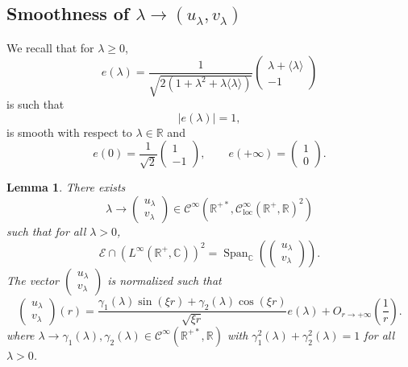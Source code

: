\documentclass[11 pt]{amsart}
\newcommand{\tmop}[1]{\ensuremath{\operatorname{#1}}}
\newtheorem{lem}{Lemma}[section]
\theoremstyle{definition}
\theoremstyle{remark}
\numberwithin{equation}{section}
\begin{document}
\subsection{Smoothness of $\lambda \rightarrow (u_{\lambda},
v_{\lambda})$}\label{ss27n}
We recall that for $\lambda \geqslant 0$,
\[ e (\lambda) = \frac{1}{\sqrt{2 \left( 1 + \lambda^2 + \lambda
   \langle \lambda \rangle \right)}} \left(\begin{array}{c}
     \lambda + \langle \lambda \rangle\\
     - 1
   \end{array}\right) \]
is such that
\[ | e (\lambda) | = 1, \]
is smooth with respect to $\lambda\in \mathbb R$ and
\[ e (0) = \frac{1}{\sqrt{2}} \left(\begin{array}{c}
     1\\
     - 1
   \end{array}\right), \qquad e (+ \infty) = \left(\begin{array}{c}
     1\\
     0
   \end{array}\right) . \]
\begin{lem}
  \label{london}There exists
  \[ \lambda \rightarrow \left(\begin{array}{c}
       u_{\lambda}\\
       v_{\lambda}
     \end{array}\right) \in \mathcal{C}^\infty (\mathbb{R}^{+ \ast},
     \mathcal{C}^\infty_{\tmop{loc}} (\mathbb{R}^+, \mathbb{R})^2) \]
  such that for all $\lambda > 0$,
  \[ \mathcal{E} \cap (L^{\infty} (\mathbb{R}^+, \mathbb{C}))^2 =
     \tmop{Span}_{\mathbb{C}} \left( \left(\begin{array}{c}
       u_{\lambda}\\
       v_{\lambda}
     \end{array}\right) \right) . \]
  The vector $\left(\begin{array}{c}
    u_{\lambda}\\
    v_{\lambda}
  \end{array}\right)$ is normalized such that
  \[ \left(\begin{array}{c}
       u_{\lambda}\\
       v_{\lambda}
     \end{array}\right) (r) = \frac{\gamma_1 (\lambda) \sin (\xi r) +
     \gamma_2 (\lambda) \cos (\xi r)}{\sqrt{\xi r}} e(\lambda) + O_{r \rightarrow + \infty} \left( \frac{1}{r} \right) . \]
  where $\lambda \rightarrow \gamma_1 (\lambda), \gamma_2 (\lambda) \in
  \mathcal{C}^\infty (\mathbb{R}^{+ \ast}, \mathbb{R})$ with $\gamma_1^2 (\lambda) +
  \gamma_2^2 (\lambda) = 1$ for all $\lambda > 0$.
\end{lem}
\end{document}
